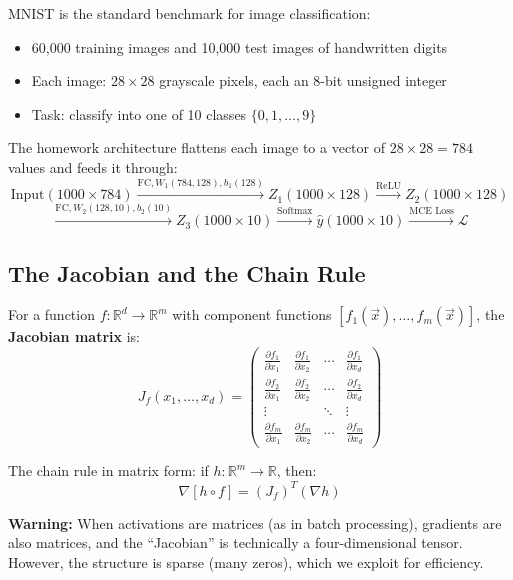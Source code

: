 \documentclass[12pt]{article}
\begin{document}
MNIST is the standard benchmark for image classification:
\begin{itemize}
  \item 60,000 training images and 10,000 test images of handwritten digits
  \item Each image: $28 \times 28$ grayscale pixels, each an 8-bit unsigned integer
  \item Task: classify into one of 10 classes $\{0, 1, \ldots, 9\}$
\end{itemize}

The homework architecture flattens each image to a vector of $28 \times 28 = 784$ values and feeds it through:
\[
\text{Input}(1000 \times 784)
\xrightarrow{\text{FC}, W_1(784,128), b_1(128)}
Z_1(1000 \times 128)
\xrightarrow{\text{ReLU}}
Z_2(1000 \times 128)
\]
\[
\xrightarrow{\text{FC}, W_2(128,10), b_2(10)}
Z_3(1000 \times 10)
\xrightarrow{\text{Softmax}}
\hat{y}(1000 \times 10)
\xrightarrow{\text{MCE Loss}}
\mathcal{L}
\]

\subsection{The Jacobian and the Chain Rule}

For a function $f : \mathbb{R}^d \to \mathbb{R}^m$ with component functions $[f_1(\vec{x}), \ldots, f_m(\vec{x})]$, the \textbf{Jacobian matrix} is:
\[
J_f(x_1, \ldots, x_d) = \begin{pmatrix}
\frac{\partial f_1}{\partial x_1} & \frac{\partial f_1}{\partial x_2} & \cdots & \frac{\partial f_1}{\partial x_d} \\
\frac{\partial f_2}{\partial x_1} & \frac{\partial f_2}{\partial x_2} & \cdots & \frac{\partial f_2}{\partial x_d} \\
\vdots & & \ddots & \vdots \\
\frac{\partial f_m}{\partial x_1} & \frac{\partial f_m}{\partial x_2} & \cdots & \frac{\partial f_m}{\partial x_d}
\end{pmatrix}
\]

The chain rule in matrix form: if $h : \mathbb{R}^m \to \mathbb{R}$, then:
\[
\nabla[h \circ f] = (J_f)^T (\nabla h)
\]

\begin{notebox}
\textbf{Warning:} When activations are matrices (as in batch processing), gradients
are also matrices, and the ``Jacobian'' is technically a four-dimensional tensor.
However, the structure is sparse (many zeros), which we exploit for efficiency.
\end{notebox}
\end{document}
